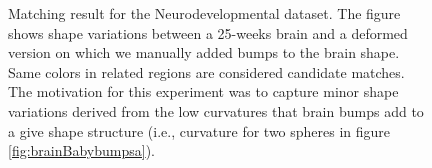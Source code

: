 \documentclass[]{article}
\begin{document}
\begin{figure}[ht!]
	\centering
	\caption{Matching result for the Neurodevelopmental dataset. The figure shows shape variations between a 25-weeks brain and a deformed version on which we manually added bumps to the brain shape. Same colors in related regions are considered candidate matches. The motivation for this experiment was to capture minor shape variations derived from the low curvatures that brain bumps add to a give shape structure (i.e., curvature for two spheres in figure \ref{fig:brainBabybumpsa}).}
	\label{fig:brainBabybumps}
\end{figure}
\end{document}
